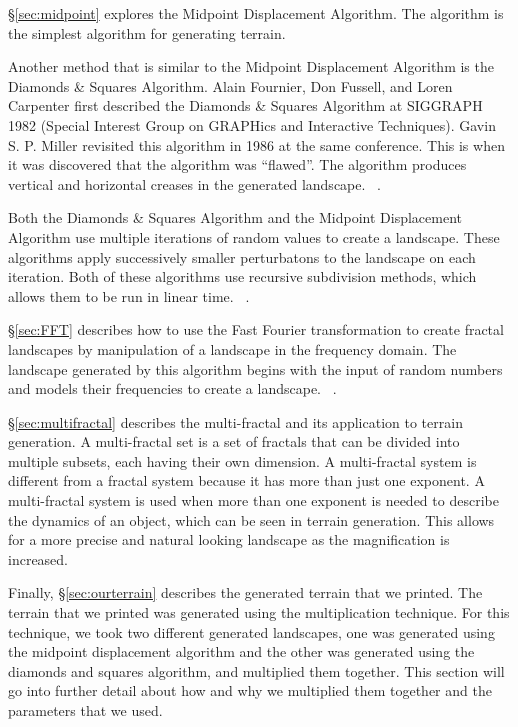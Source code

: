 \documentclass[11pt,twocolumn]{article}
\begin{document}
	\S \ref{sec:midpoint} explores the Midpoint Displacement Algorithm.
	The algorithm is the simplest algorithm for generating terrain.

	Another method that is similar to the Midpoint Displacement Algorithm is the Diamonds \& Squares Algorithm.
	Alain Fournier, Don Fussell, and Loren Carpenter first described the Diamonds \& Squares Algorithm at SIGGRAPH 1982 (Special Interest
	Group on GRAPHics and Interactive Techniques). Gavin S. P. Miller revisited this algorithm in 1986 at the same conference. This is when
	it was discovered that the algorithm was ``flawed''. The algorithm produces vertical and horizontal creases in the generated landscape.
	~\cite{Miller}.

	Both the Diamonds \& Squares Algorithm and the Midpoint Displacement Algorithm use multiple iterations of random values to create a landscape.
	These algorithms apply successively smaller perturbatons to the landscape on each iteration. Both of these algorithms use recursive subdivision methods, which allows them to be run in
	linear time. ~\cite{Miller}.

	\S \ref{sec:FFT} describes how to use the Fast Fourier transformation to create fractal landscapes by manipulation
	of a landscape in the frequency domain. The landscape generated by this algorithm begins with the input
	of random numbers and models their frequencies to create a landscape. ~\cite{Kareem}.
	
	\S \ref{sec:multifractal} describes the multi-fractal and its application to terrain generation. A multi-fractal
	set is a set of fractals that can be divided into multiple subsets, each having their own dimension. A multi-fractal
	system is different from a fractal system because it has more than just one exponent. A multi-fractal system is used when
	more than one exponent is needed to describe the dynamics of an object, which can be seen in terrain generation. This allows
	for a more precise and natural looking landscape as the magnification is increased. 
	
	Finally, \S \ref{sec:ourterrain} describes the generated terrain that we printed.
	The terrain that we printed was generated using the multiplication technique.
	For this technique, we took two different generated landscapes, one was generated using the midpoint
	displacement algorithm and the other was generated using the diamonds and squares algorithm, and multiplied them
	together. This section will go into further detail about how and why we multiplied them together and the parameters
	that we used.
	
\end{document}
